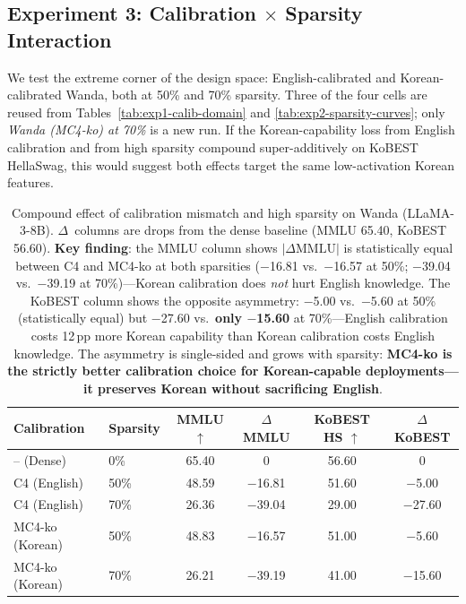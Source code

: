 \documentclass{article}
\begin{document}
\subsection{Experiment 3: Calibration $\times$ Sparsity Interaction}
\label{sec:exp3}

We test the extreme corner of the design space: English-calibrated and
Korean-calibrated Wanda, both at 50\% and 70\% sparsity. Three of the four
cells are reused from Tables~\ref{tab:exp1-calib-domain} and
\ref{tab:exp2-sparsity-curves}; only \emph{Wanda (MC4-ko) at 70\%} is a new
run. If the Korean-capability loss from English calibration and from high
sparsity compound super-additively on KoBEST HellaSwag, this would suggest
both effects target the same low-activation Korean features.

\begin{table}[h]
  \caption{Compound effect of calibration mismatch and high sparsity on
           Wanda (LLaMA-3-8B). $\Delta$~columns are drops from the
           dense baseline (MMLU 65.40, KoBEST 56.60). \textbf{Key
           finding}: the MMLU column shows $|\Delta\text{MMLU}|$ is
           statistically equal between C4 and MC4-ko at both sparsities
           ($-$16.81 vs.\ $-$16.57 at 50\%; $-$39.04 vs.\ $-$39.19 at
           70\%)---Korean calibration does \emph{not} hurt English
           knowledge. The KoBEST column shows the opposite asymmetry:
           $-$5.00 vs.\ $-$5.60 at 50\% (statistically equal) but
           $-$27.60 vs.\ \textbf{only $-$15.60} at 70\%---English
           calibration costs 12\,pp more Korean capability than Korean
           calibration costs English knowledge. The asymmetry is
           single-sided and grows with sparsity:
           \textbf{MC4-ko is the strictly better calibration choice for
           Korean-capable deployments---it preserves Korean without
           sacrificing English}.}
  \label{tab:exp3-calib-x-sparsity}
  \centering
  \small
  \begin{tabular}{llcccc}
    \toprule
    Calibration & Sparsity & MMLU $\uparrow$ & $\Delta$MMLU & KoBEST HS $\uparrow$ & $\Delta$KoBEST \\
    \midrule
    -- (Dense)         & 0\%   & 65.40 & 0         & 56.60 & 0 \\
    \midrule
    C4 (English)       & 50\%  & 48.59 & $-$16.81  & 51.60 & $-$5.00 \\
    C4 (English)       & 70\%  & 26.36 & $-$39.04  & 29.00 & $-$27.60 \\
    \midrule
    MC4-ko (Korean)    & 50\%  & 48.83 & $-$16.57  & 51.00 & $-$5.60 \\
    MC4-ko (Korean)    & 70\%  & 26.21 & $-$39.19  & 41.00 & $-$15.60 \\
    \bottomrule
  \end{tabular}
\end{table}
\end{document}
